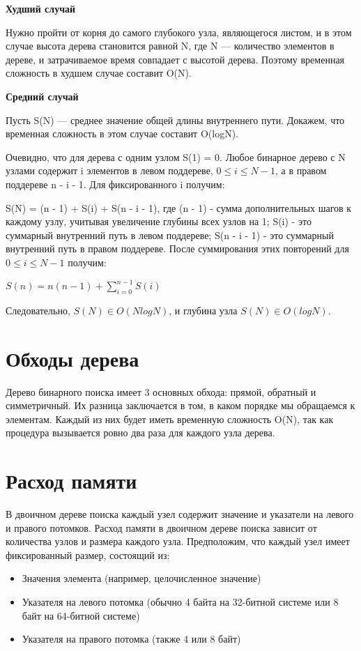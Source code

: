 \documentclass[bachelor, och, referat, times]{SCWorks}
\begin{document}
\textbf{Худший случай}

Нужно пройти от корня до самого глубокого узла, являющегося листом, 
и в этом случае высота дерева становится равной N, 
где N — количество элементов в дереве, и затрачиваемое время совпадает с высотой дерева. 
Поэтому временная сложность в худшем случае составит O(N).
\vspace{5mm}

\textbf{Средний случай}

Пусть S(N) — среднее значение общей длины внутреннего пути. 
Докажем, что временная сложность в этом случае составит O(logN).

Очевидно, что для дерева с одним узлом S(1) = 0. 
Любое бинарное дерево с N узлами содержит i элементов в левом поддереве, 
$0 \leq  i \leq  N - 1$, а в правом поддереве n - i - 1. Для фиксированного i получим:

 S(N) = (n - 1) + S(i) + S(n - i - 1), где  (n - 1)  - сумма дополнительных шагов к каждому узлу, 
 учитывая увеличение глубины всех узлов на 1; 
 S(i) - это суммарный внутренний путь в левом поддереве; 
 S(n - i - 1) - это суммарный внутренний путь в правом поддереве. 
 После суммирования этих повторений для $0 \leq  i \leq  N - 1$ получим:

$ S(n)=n(n-1)+\sum_{i=0}^{n-1} S(i) $


Следовательно, $S(N) \in  O(NlogN)$, и глубина узла $S(N) \in  O(logN)$.


  \section{Обходы дерева}

  Дерево бинарного поиска имеет 3 основных обхода: прямой, 
  обратный и симметричный. Их разница заключается в том, 
  в каком порядке мы обращаемся к элементам. 
  Каждый из них будет иметь временную сложность O(N), 
  так как процедура вызывается ровно два раза для каждого узла дерева.

  \section{Расход памяти}


  В двоичном дереве поиска каждый узел содержит значение и 
  указатели на левого и правого потомков. 
  Расход памяти в двоичном дереве поиска зависит от количества узлов и размера каждого узла.
Предположим, что каждый узел имеет фиксированный размер, состоящий из:

\begin{itemize}
\item Значения элемента (например, целочисленное значение)

\item Указателя на левого потомка (обычно 4 байта на 32-битной системе или 8 байт 
на 64-битной системе)

\item  Указателя на правого потомка (также 4 или 8 байт)
\end{itemize}
\end{document}
